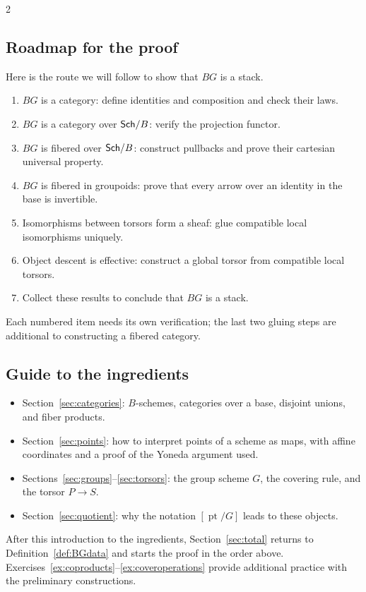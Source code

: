 \documentclass[12pt]{memoir}
\begin{document}
\begin{multicols}{2}
\subsection{Roadmap for the proof}
Here is the route we will follow to show that $BG$ is a stack.
\begin{enumerate}[label=(\arabic*)]
\raggedright
\item $BG$ is a category: define identities and composition and check
their laws.
\item $BG$ is a category over $\mathsf{Sch}/B$: verify the projection functor.
\item $BG$ is fibered over $\mathsf{Sch}/B$: construct pullbacks and prove
their cartesian universal property.
\item $BG$ is fibered in groupoids: prove that every arrow over an
identity in the base is invertible.
\item Isomorphisms between torsors form a sheaf: glue compatible local
isomorphisms uniquely.
\item Object descent is effective: construct a global torsor from
compatible local torsors.
\item Collect these results to conclude that $BG$ is a stack.
\end{enumerate}
Each numbered item needs its own verification; the last two gluing
steps are additional to constructing a fibered category.

\subsection{Guide to the ingredients}
\begin{itemize}
\item Section~\ref{sec:categories}: $B$-schemes, categories over a base,
disjoint unions, and fiber products.
\item Section~\ref{sec:points}: how to interpret points of a scheme as
maps, with affine coordinates and a proof of the Yoneda argument used.
\item Sections~\ref{sec:groups}--\ref{sec:torsors}: the group scheme
$G$, the covering rule, and the torsor $P\to S$.
\item Section~\ref{sec:quotient}: why the notation $[\operatorname{pt}/G]$
leads to these objects.
\end{itemize}
After this introduction to the ingredients, Section~\ref{sec:total}
returns to Definition~\ref{def:BGdata} and starts the proof in the
order above. Exercises~\ref{ex:coproducts}--\ref{ex:coveroperations}
provide additional practice with the preliminary constructions.


\end{multicols}
\end{document}
